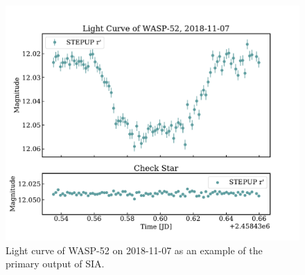 \documentclass[11pt]{report}
\begin{document}
\begin{figure}[!h]\label{fig:wasplightcurve}
\begin{center}
\includegraphics[totalheight=.3\textheight]{wasplightcurve.pdf}
\caption{Light curve of WASP-52 on 2018-11-07 as an example of the primary output of SIA.}
\end{center}
\end{figure}
\end{document}

